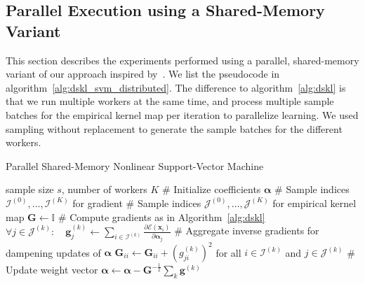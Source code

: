 \documentclass{article} %
\newcommand{\va}{\boldsymbol{\alpha}}
\renewcommand{\vec}[1]{\mathbf{#1}}
\begin{document}
 \subsection{Parallel Execution using a Shared-Memory Variant}\label{sec:distributed}
This section describes the experiments performed using a parallel, shared-memory variant of our approach inspired by~\cite{Agarwal2014}. We list the pseudocode in algorithm~\autoref{alg:dskl_svm_distributed}. The difference to algorithm~\autoref{alg:dskl} is that we run multiple workers at the same time, and process multiple sample batches for the empirical kernel map per iteration to parallelize learning. We used sampling without replacement to generate the sample batches for the different workers. 

 \begin{algorithm}
   \begin{algorithmic}[1]
     \caption{Parallel Shared-Memory Nonlinear Support-Vector Machine\label{alg:dskl_svm_distributed}}
       \REQUIRE sample size $s$, number of workers $K$
       \STATE \# Initialize coefficients $\va$
       \STATE \# Sample indices $\mathcal{I}^{(0)},\dots,\mathcal{I}^{(K)}$ for gradient 
       \STATE \# Sample indices $\mathcal{J}^{(0)},\dots,\mathcal{J}^{(K)}$ for empirical kernel map 
       \STATE $\vec{G} \leftarrow \mathbb{I}$
             \STATE \# Compute gradients as in Algorithm~\autoref{alg:dskl}
             \STATE $\forall j \in \mathcal{J}^{(k)}: \quad \vec{g}^{(k)}_{j} \gets \sum_{i\in\mathcal{I}^{(k)}}\frac{\partial \mathcal{E}(\vec{x}_i)}{\partial\va_{j}}$
             \STATE \# Aggregate inverse gradients for dampening updates of $\va$
             \STATE $\vec{G}_{ii} \leftarrow \vec{G}_{ii} + \left(g^{(k)}_{ji}\right)^2$ for all $i \in\mathcal{I}^{(k)}$ and $j\in\mathcal{J}^{(k)}$
           \ENDFOR
         \ENDFOR
         \STATE \# Update weight vector 
         \STATE $\va \leftarrow \va - \vec{G}^{-\frac{1}{2}} \sum_k \vec{g}^{(k)}$
       \ENDWHILE
   \end{algorithmic}
 \end{algorithm}
\end{document}
